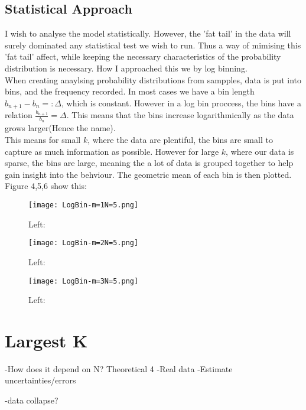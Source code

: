 \documentclass[]{article}
\begin{document}
\subsection{Statistical Approach}
I wish to analyse the model statistically. However, the 'fat tail' in the data will surely dominated any statistical test we wish to run. Thus a way of mimising this 'fat tail' affect, while keeping the necessary characteristics of the probability distribution is necessary. How I approached this we by log binning.\\
When creating anaylsing probability distributions from sampples, data is put into bins, and the frequency recorded. In most cases we have a bin length $b_{n+1}-b_{n}=:\Delta$, which is constant. However in a log bin proccess, the bins have a relation $\frac{b_{n+1}}{b_n}=\Delta$. This means that the bins increase logarithmically as the data grows larger(Hence the name). \\
This means for small $k$, where the data are plentiful, the bins are small to capture as much information as possible. However for large $k$,  where our data is sparse, the bins are large, meaning the a lot of data is grouped together to help gain insight into the behviour. The geometric mean of each bin is then plotted. Figure 4,5,6 show this:
 \begin{figure}[htp]
 	\centering
 	
 	\texttt{[image: LogBin-m=1N=5.png]}
 	\caption{Left: \textit{}}
 \end{figure}
  \begin{figure}[htp]
  	\centering
  	
  	\texttt{[image: LogBin-m=2N=5.png]}
  	\caption{Left: \textit{}}
  \end{figure}
   \begin{figure}[htp]
   	\centering
   	
   	\texttt{[image: LogBin-m=3N=5.png]}
   	\caption{Left: \textit{}}
   \end{figure}
\section{Largest K}
-How does it depend on N? Theoretical 4
-Real data
-Estimate uncertainties/errors

-data collapse?
\end{document}
